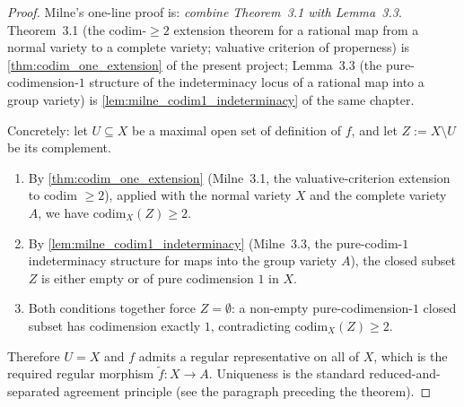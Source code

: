 \begin{proof}
  
  Milne's one-line proof is: \emph{combine Theorem~3.1 with Lemma~3.3}.
  Theorem~3.1 (the codim-\(\geq 2\) extension theorem for a rational map from a normal
  variety to a complete variety; valuative criterion of properness) is
  \cref{thm:codim_one_extension} of the present project; Lemma~3.3 (the
  pure-codimension-\(1\) structure of the indeterminacy locus of a rational map into a
  group variety) is \cref{lem:milne_codim1_indeterminacy} of the same chapter.

  Concretely: let \(U \subseteq X\) be a maximal open set of definition of \(f\), and let
  \(Z := X \setminus U\) be its complement.
  \begin{enumerate}
    \item By \cref{thm:codim_one_extension} (Milne~3.1, the valuative-criterion extension
      to codim \(\geq 2\)), applied with the normal variety \(X\) and the complete variety
      \(A\), we have \(\mathrm{codim}_X(Z) \geq 2\).
    \item By \cref{lem:milne_codim1_indeterminacy} (Milne~3.3, the pure-codim-\(1\)
      indeterminacy structure for maps into the group variety \(A\)), the closed subset
      \(Z\) is either empty or of pure codimension \(1\) in \(X\).
    \item Both conditions together force \(Z = \emptyset\): a non-empty pure-codimension-\(1\)
      closed subset has codimension exactly \(1\), contradicting \(\mathrm{codim}_X(Z) \geq 2\).
  \end{enumerate}
  Therefore \(U = X\) and \(f\) admits a regular representative on all of \(X\), which is the
  required regular morphism \(\widetilde f \colon X \to A\). Uniqueness is the standard
  reduced-and-separated agreement principle (see the paragraph preceding the theorem).
\end{proof}

